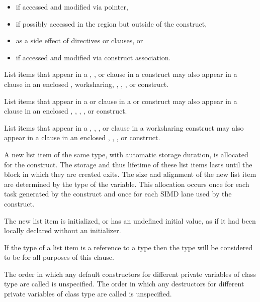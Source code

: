 {{{{\begin{itemize}
\item if accessed and modified via pointer, 

\item if possibly accessed in the region but outside of the construct, 

\item as a side effect of directives or clauses, or

\fortranspecificstart
\item if accessed and modified via construct association.
\fortranspecificend
\end{itemize}

List items that appear in a , , or
 clause in a  construct may also appear
in a  clause in an enclosed ,
worksharing, , , , or
 construct.

List items that appear in a  or 
clause in a  or  construct may also appear in a 
clause in an enclosed , , , , or
 construct.

List items that appear in a , ,
, or  clause in a worksharing
construct may also appear in a  clause in an enclosed
, , , or  construct.

\ccppspecificstart
A new list item of the same type, with automatic storage duration, is allocated for the 
construct. The storage and thus lifetime of these list items lasts until the block in which 
they are created exits. The size and alignment of the new list item are determined by the 
type of the variable. This allocation occurs once for each task generated by the construct 
and once for each SIMD lane used by the construct.

The new list item is initialized, or has an undefined initial value, as if it had been locally 
declared without an initializer. 
\ccppspecificend

\cppspecificstart
If the type of a list item is a reference to a type  then the type will be considered to be 
 for all purposes of this clause.

The order in which any default constructors for different private variables of class type 
are called is unspecified. The order in which any destructors for different private 
variables of class type are called is unspecified.
\cppspecificend

}}}}
